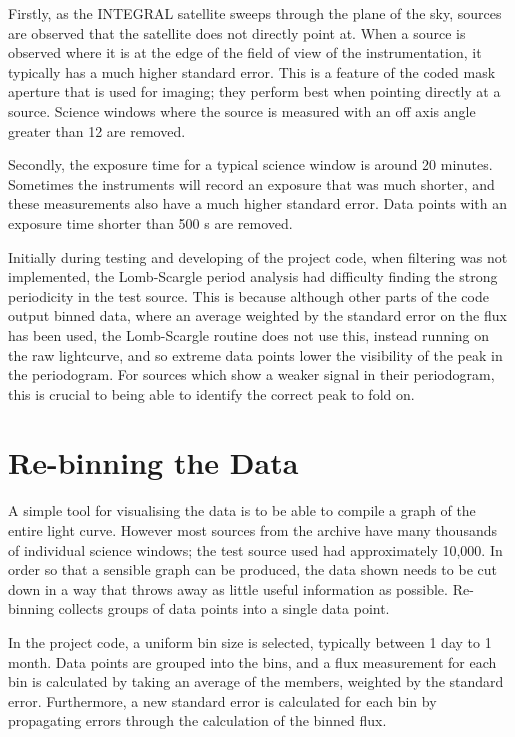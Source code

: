 Firstly, as the INTEGRAL satellite sweeps through the plane of the sky, sources are observed that the satellite does not directly point at. When a source is observed where it is at the edge of the field of view of the instrumentation, it typically has a much higher standard error. This is a feature of the coded mask aperture that is used for imaging; they perform best when pointing directly at a source. Science windows where the source is measured with an off axis angle greater than 12 \textdegree{} are removed. 

Secondly, the exposure time for a typical science window is around 20 minutes.  Sometimes the instruments will record an exposure that was much shorter, and these measurements also have a much higher standard error. Data points with an exposure time shorter than 500 s are removed. 

Initially during testing and developing of the project code, when filtering was not implemented, the Lomb-Scargle period analysis had difficulty finding the strong periodicity in the test source. This is because although other parts of the code output binned data, where an average weighted by the standard error on the flux has been used, the Lomb-Scargle routine does not use this, instead running on the raw lightcurve, and so extreme data points lower the visibility of the peak in the periodogram. For sources which show a weaker signal in their periodogram, this is crucial to being able to identify the correct peak to fold on.

\section{Re-binning the Data}
A simple tool for visualising the data is to be able to compile a graph of the entire light curve. However most sources from the archive have many thousands of individual science windows; the test source used had approximately 10,000. In order so that a sensible graph can be produced, the data shown needs to be cut down in a way that throws away as little useful information as possible. Re-binning collects groups of data points into a single data point. 

In the project code, a uniform bin size is selected, typically between 1 day to 1 month. Data points are grouped into the bins, and a flux measurement for each bin is calculated by taking an average of the members, weighted by the standard error. Furthermore, a new standard error is calculated for each bin by propagating errors through the calculation of the binned flux.

